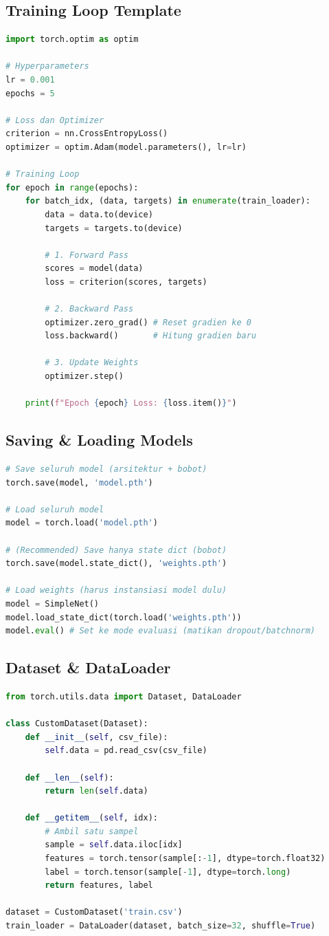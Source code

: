 \subsection{Training Loop Template}
\begin{lstlisting}[language=Python]
import torch.optim as optim

# Hyperparameters
lr = 0.001
epochs = 5

# Loss dan Optimizer
criterion = nn.CrossEntropyLoss()
optimizer = optim.Adam(model.parameters(), lr=lr)

# Training Loop
for epoch in range(epochs):
    for batch_idx, (data, targets) in enumerate(train_loader):
        data = data.to(device)
        targets = targets.to(device)

        # 1. Forward Pass
        scores = model(data)
        loss = criterion(scores, targets)

        # 2. Backward Pass
        optimizer.zero_grad() # Reset gradien ke 0
        loss.backward()       # Hitung gradien baru

        # 3. Update Weights
        optimizer.step()

    print(f"Epoch {epoch} Loss: {loss.item()}")
\end{lstlisting}

\subsection{Saving & Loading Models}
\begin{lstlisting}[language=Python]
# Save seluruh model (arsitektur + bobot)
torch.save(model, 'model.pth')

# Load seluruh model
model = torch.load('model.pth')

# (Recommended) Save hanya state dict (bobot)
torch.save(model.state_dict(), 'weights.pth')

# Load weights (harus instansiasi model dulu)
model = SimpleNet()
model.load_state_dict(torch.load('weights.pth'))
model.eval() # Set ke mode evaluasi (matikan dropout/batchnorm)
\end{lstlisting}

\subsection{Dataset & DataLoader}
\begin{lstlisting}[language=Python]
from torch.utils.data import Dataset, DataLoader

class CustomDataset(Dataset):
    def __init__(self, csv_file):
        self.data = pd.read_csv(csv_file)

    def __len__(self):
        return len(self.data)

    def __getitem__(self, idx):
        # Ambil satu sampel
        sample = self.data.iloc[idx]
        features = torch.tensor(sample[:-1], dtype=torch.float32)
        label = torch.tensor(sample[-1], dtype=torch.long)
        return features, label

dataset = CustomDataset('train.csv')
train_loader = DataLoader(dataset, batch_size=32, shuffle=True)
\end{lstlisting}

